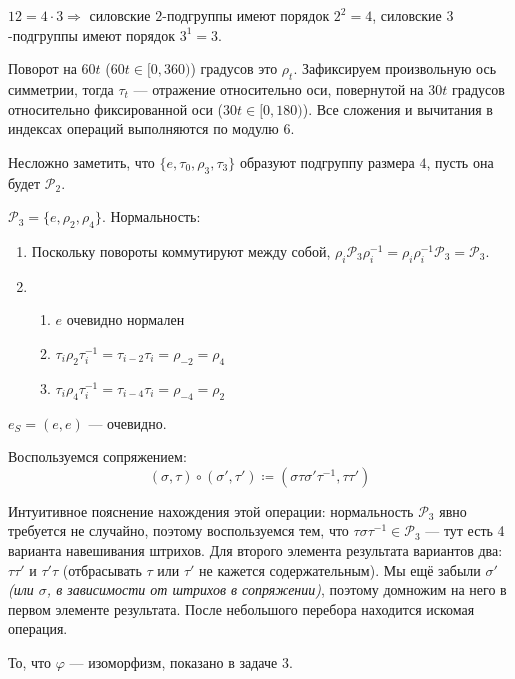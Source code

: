 \begin{solution}
    \(12 = 4 \cdot 3 \Rightarrow\) силовские \(2\)-подгруппы имеют порядок \(2^2 = 4\), силовские \(3\)-подгруппы имеют порядок \(3^1 = 3\).

    \begin{notation}
        Поворот на \(60t\) (\(60t \in [0, 360)\)) градусов это \(\rho_t\). Зафиксируем произвольную ось симметрии, тогда \(\tau_t\) --- отражение относительно оси, повернутой на \(30t\) градусов относительно фиксированной оси (\(30t \in [0, 180)\)). Все сложения и вычитания в индексах операций выполняются по модулю \(6\).
    \end{notation}

    Несложно заметить, что \(\{e, \tau_0, \rho_3, \tau_3\}\) образуют подгруппу размера \(4\), пусть она будет \(\mathcal{P}_2\).

    \(\mathcal{P}_3 = \{e, \rho_2, \rho_4\}\). Нормальность:
    \begin{enumerate}
        \item Поскольку повороты коммутируют между собой, \(\rho_i \mathcal{P}_3 \rho_i^{-1} = \rho_i\rho_i^{-1} \mathcal{P}_3 = \mathcal{P}_3\).
        \item \begin{enumerate}
                  \item \(e\) очевидно нормален
                  \item \(\tau_i \rho_2 \tau_i^{-1} = \tau_{i - 2} \tau_i = \rho_{ -2} = \rho_4\)
                  \item \(\tau_i \rho_4 \tau_i^{-1} = \tau_{i - 4} \tau_i = \rho_{ -4} = \rho_2\)
              \end{enumerate}
    \end{enumerate}

    \(e_S = (e, e)\) --- очевидно.

    Воспользуемся сопряжением:
    \[(\sigma, \tau) \circ (\sigma', \tau') \coloneqq (\sigma \tau \sigma' \tau^{-1}, \tau \tau')\]

    Интуитивное пояснение нахождения этой операции: нормальность \(\mathcal{P}_3\) явно требуется не случайно, поэтому воспользуемся тем, что \(\tau \sigma \tau^{-1} \in \mathcal{P}_3\) --- тут есть 4 варианта навешивания штрихов. Для второго элемента результата вариантов два: \(\tau \tau'\) и \(\tau' \tau\) (отбрасывать \(\tau\) или \(\tau'\) не кажется содержательным). Мы ещё забыли \(\sigma'\) \textit{(или \(\sigma\), в зависимости от штрихов в сопряжении)}, поэтому домножим на него в первом элементе результата. После небольшого перебора находится искомая операция.

    \begin{remark}
        То, что \(\varphi\) --- изоморфизм, показано в задаче 3.
    \end{remark}
\end{solution}

